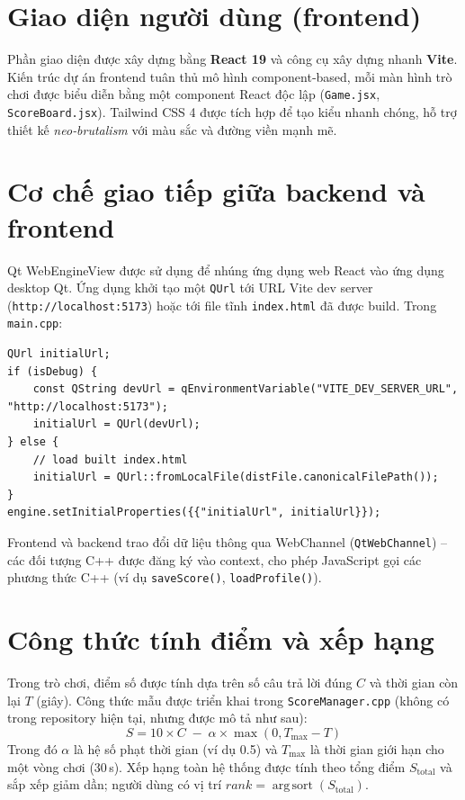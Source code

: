 \section{Giao diện người dùng (frontend)}
\label{sec:frontend}
Phần giao diện được xây dựng bằng \textbf{React 19} và công cụ xây dựng nhanh \textbf{Vite}.  Kiến trúc dự án frontend tuân thủ mô hình component‑based, mỗi màn hình trò chơi được biểu diễn bằng một component React độc lập (\texttt{Game.jsx}, \texttt{ScoreBoard.jsx}).  Tailwind CSS 4 được tích hợp để tạo kiểu nhanh chóng, hỗ trợ thiết kế \textit{neo‑brutalism} với màu sắc và đường viền mạnh mẽ.

\section{Cơ chế giao tiếp giữa backend và frontend}
\label{sec:communication}
Qt WebEngineView được sử dụng để nhúng ứng dụng web React vào ứng dụng desktop Qt. Ứng dụng khởi tạo một \texttt{QUrl} tới URL Vite dev server (\texttt{http://localhost:5173}) hoặc tới file tĩnh \texttt{index.html} đã được build. Trong \texttt{main.cpp}:
\begin{verbatim}
QUrl initialUrl;
if (isDebug) {
    const QString devUrl = qEnvironmentVariable("VITE_DEV_SERVER_URL", "http://localhost:5173");
    initialUrl = QUrl(devUrl);
} else {
    // load built index.html
    initialUrl = QUrl::fromLocalFile(distFile.canonicalFilePath());
}
engine.setInitialProperties({{"initialUrl", initialUrl}});
\end{verbatim}
Frontend và backend trao đổi dữ liệu thông qua WebChannel (\texttt{QtWebChannel}) – các đối tượng C++ được đăng ký vào context, cho phép JavaScript gọi các phương thức C++ (ví dụ \texttt{saveScore()}, \texttt{loadProfile()}).

\section{Công thức tính điểm và xếp hạng}
\label{sec:scoring}
Trong trò chơi, điểm số được tính dựa trên số câu trả lời đúng \(C\) và thời gian còn lại \(T\) (giây).  Công thức mẫu được triển khai trong \texttt{ScoreManager.cpp} (không có trong repository hiện tại, nhưng được mô tả như sau):
\begin{equation}
S = 10\times C \; - \; \alpha \times \max(0, T_{\max} - T)
\label{eq:score}
\end{equation}
Trong đó \(\alpha\) là hệ số phạt thời gian (ví dụ 0.5) và \(T_{\max}\) là thời gian giới hạn cho một vòng chơi (30 s).  Xếp hạng toàn hệ thống được tính theo tổng điểm \(S_{\text{total}}\) và sắp xếp giảm dần; người dùng có vị trí \(rank = \operatorname{arg\,sort}(S_{\text{total}})\).

